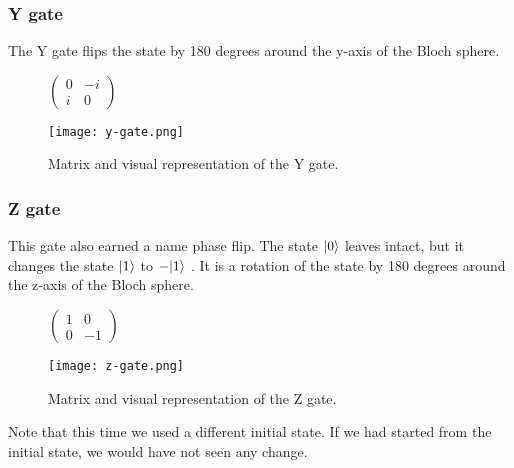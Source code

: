 \subsubsection{Y gate}
The Y gate flips the state by 180 degrees around the y-axis of the Bloch sphere.
\begin{figure}[H]
    \centering
    \begin{minipage}{0.4\linewidth}
      \centering
      $\begin{pmatrix}
        0 & -i \\
        i & 0
        \end{pmatrix}$
      \vfill
    \end{minipage}
    \begin{minipage}{0.25\linewidth}
      \centering
      \texttt{[image: y-gate.png]}
      \vfill
    \end{minipage}
    \caption{Matrix and visual representation of the Y gate.}
\end{figure}


\subsubsection{Z gate}
This gate also earned a name phase flip. The state $\lvert0\rangle$ leaves intact, but it changes the state $\lvert1\rangle$ to $-\lvert1\rangle$ \cite{qc}. It is a rotation of the state by 180 degrees around the z-axis of the Bloch sphere.
\begin{figure}[H]
    \centering
    \begin{minipage}{0.4\linewidth}
      \centering
      $\begin{pmatrix}
        1 & 0 \\
        0 & -1
        \end{pmatrix}$
      \vfill
    \end{minipage}
    \begin{minipage}{0.25\linewidth}
      \centering
      \texttt{[image: z-gate.png]}
      \vfill
    \end{minipage}
    \caption{Matrix and visual representation of the Z gate.}
\end{figure}

Note that this time we used a different initial state. If we had started from the initial state, we would have not seen any change.

